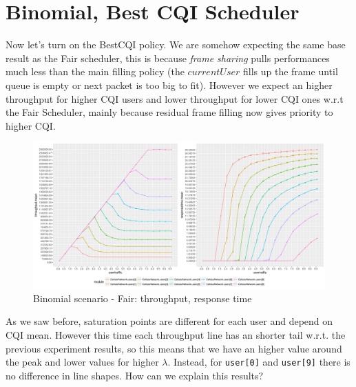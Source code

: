 \section{Binomial, Best CQI Scheduler}
Now let's turn on the BestCQI policy. We are somehow expecting the same base result as the Fair scheduler, this is because \textit{frame sharing} pulls performances much less than the main filling policy (the \(currentUser\) fills up the frame until queue is empty or next packet is too big to fit). However we expect an higher throughput for higher CQI users and lower throughput for lower CQI ones w.r.t the Fair Scheduler, mainly because residual frame filling now gives priority to higher CQI.

\begin{figure}[H]
  \includegraphics[width=1\textwidth]{images/all-binombest.png}
  \caption{Binomial scenario - Fair: throughput, response time}
  \label{fig:all-binombest}
\end{figure}

As we saw before, saturation points are different for each user and depend on CQI mean. However this time each throughput line has an shorter tail w.r.t. the previous experiment results, so this means that we have an higher value around the peak and lower values for higher \(\lambda\). Instead, for \texttt{user[0]} and \texttt{user[9]} there is no difference in line shapes. How can we explain this results?

